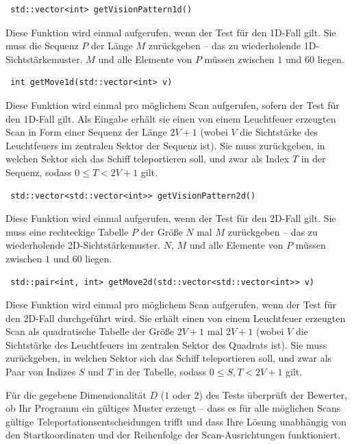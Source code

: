 \documentclass[12pt]{article}
\begin{document}
\begin{lstlisting}
 std::vector<int> getVisionPattern1d()
\end{lstlisting}

Diese Funktion wird einmal aufgerufen, wenn der Test für den 1D-Fall gilt. Sie muss die Sequenz $P$ der Länge $M$ zurückgeben – das zu wiederholende 1D-Sichtstärkemuster. $M$ und alle Elemente von $P$ müssen zwischen $1$ und $60$ liegen.

\begin{lstlisting}
 int getMove1d(std::vector<int> v)
\end{lstlisting}

Diese Funktion wird einmal pro möglichem Scan aufgerufen, sofern der Test für den 1D-Fall gilt. Als Eingabe erhält sie einen von einem Leuchtfeuer erzeugten Scan in Form einer Sequenz der Länge $2V + 1$ (wobei $V$ die Sichtstärke des Leuchtfeuers im zentralen Sektor der Sequenz ist). Sie muss zurückgeben, in welchen Sektor sich das Schiff teleportieren soll, und zwar als Index $T$ in der Sequenz, sodass $0 \leq T < 2V + 1$ gilt.

\begin{lstlisting}
 std::vector<std::vector<int>> getVisionPattern2d()
\end{lstlisting}

Diese Funktion wird einmal aufgerufen, wenn der Test für den 2D-Fall gilt. Sie muss eine rechteckige Tabelle $P$ der Größe $N$ mal $M$ zurückgeben – das zu wiederholende 2D-Sichtstärkemuster. $N$, $M$ und alle Elemente von $P$ müssen zwischen $1$ und $60$ liegen.

\begin{lstlisting}
 std::pair<int, int> getMove2d(std::vector<std::vector<int>> v)
\end{lstlisting}

Diese Funktion wird einmal pro möglichem Scan aufgerufen, wenn der Test für den 2D-Fall durchgeführt wird. Sie erhält einen von einem Leuchtfeuer erzeugten Scan als quadratische Tabelle der Größe $2V + 1$ mal $2V + 1$ (wobei $V$ die Sichtstärke des Leuchtfeuers im zentralen Sektor des Quadrats ist). Sie muss zurückgeben, in welchen Sektor sich das Schiff teleportieren soll, und zwar als Paar von Indizes $S$ und $T$ in der Tabelle, sodass $0 \leq S, T < 2V + 1$ gilt.

Für die gegebene Dimensionalität $D$ ($1$ oder $2$) des Tests überprüft der Bewerter, ob Ihr Programm ein gültiges Muster erzeugt – dass es für alle möglichen Scans gültige Teleportationsentscheidungen trifft und dass Ihre Lösung unabhängig von den Startkoordinaten und der Reihenfolge der Scan-Ausrichtungen funktioniert.
\end{document}
